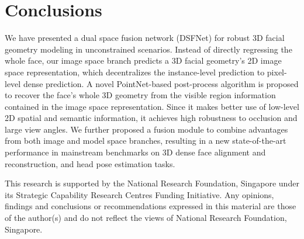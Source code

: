 \documentclass[10pt,twocolumn,letterpaper]{article}
\begin{document}
\begin{table}[]
\centering
{}
\caption{3D dense face alignment results of our image space branch on AFLW2000-3D dataset with different post-process modules. The first three are the ablation study of the input components of the PointNet. \textit{xyz},  ,  denotes using the point cloud 's 3D locations from depth map, UV locations from correspondence map, and values from confidence map as the PointNet's input.  denotes using  in training.  denotes if the point cloud is aligned to the canonical view or not before being fed to the PointNet. }
\label{tab:post_process}
\end{table}

\vspace{0.16cm}
\section{Conclusions}
\label{sec:concl}
We have presented a dual space fusion network (DSFNet) for robust 3D facial geometry modeling in unconstrained scenarios. Instead of directly regressing the whole face, our image space branch predicts a 3D facial geometry's 2D image space representation, which decentralizes the instance-level prediction to pixel-level dense prediction. A novel PointNet-based post-process algorithm is proposed to recover the face's whole 3D geometry from the visible region information contained in the image space representation. Since it makes better use of low-level 2D spatial and semantic information, it achieves high robustness to occlusion and large view angles.
We further proposed a fusion module to combine advantages from both image and model space branches, resulting in a new state-of-the-art performance in mainstream benchmarks on 3D dense face alignment and reconstruction, and head pose estimation tasks. 

\vspace{0.5cm}
\label{sec:ack}
This research is supported by the National Research Foundation, Singapore under its Strategic Capability Research Centres Funding Initiative. Any opinions, findings and conclusions or recommendations expressed in this material are those of the author(s) and do not reflect the views of National Research Foundation, Singapore.

\clearpage

{\small


}
\end{document}
